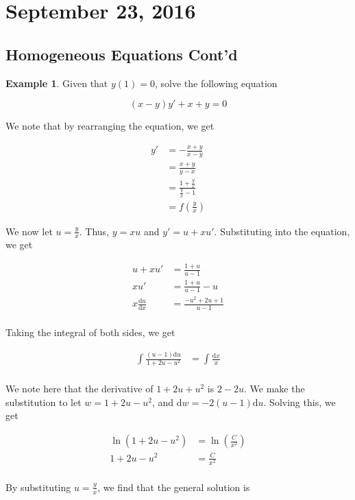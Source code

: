 \documentclass[11pt]{article}
\theoremstyle{plain} %
\theoremstyle{definition}
\theoremstyle{example}
\newtheorem*{example}{Example}
\theoremstyle{remark}
\begin{document}
\section{September 23, 2016}
\subsection{Homogeneous Equations Cont'd}

\begin{example}
Given that $y(1)=0$, solve the following equation

$$(x-y)y' + x+y=0$$
\end{example}

We note that by rearranging the equation, we get 

\begin{align*}
	y'&=-\frac{x+y}{x-y}\\
	&= \frac{x+y}{y-x}\\
	&= \frac{1+\frac{y}{x}}{\frac{y}{x}-1} \\
	&= f\left(\frac{y}{x}\right)
	\end{align*}

We now let $u =\frac{y}{x}$. Thus, $y=xu$ and $y' = u+xu'$. Substituting into the equation, we get

\begin{align*}
	u + xu' &= \frac{1+u}{u-1} \\
	xu' &= \frac{1+u}{u-1}-u\\
	x\frac{\mathrm d u}{\mathrm d x} &= \frac{-u^2+2u+1}{u-1}\\
\end{align*}

Taking the integral of both sides, we get

\begin{align*}
	\int\frac{(u-1)\mathrm d u}{1+2u-u^2} &= \int \frac{\mathrm d x}{x}\\
\end{align*}

We note here that the derivative of $1+2u + u^2$ is $2-2u$. We make the substitution to let $w = 1+2u-u^2$, and $\mathrm d w = -2(u-1)\mathrm d u$. Solving this, we get

\begin{align*}
	\ln\left(1+2u-u^2\right) &= \ln\left(\frac{C}{x^2}\right)\\
	1+2u-u^2 &= \frac{C}{x^2}\\
\end{align*}

By substituting $u = \frac{y}{x}$, we find that the general solution is 
\end{document}
